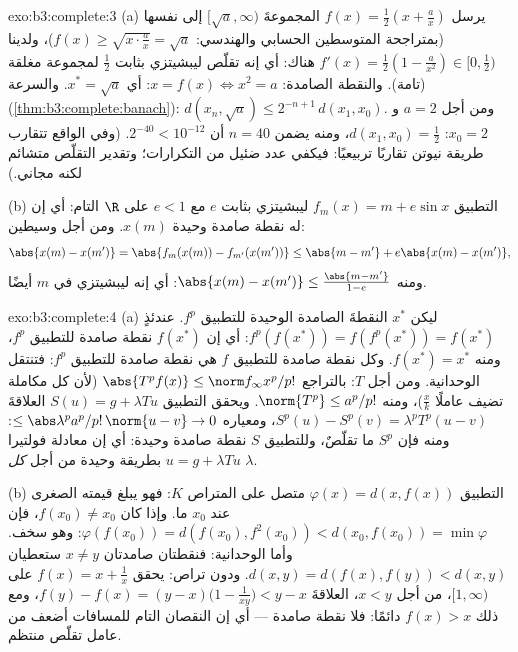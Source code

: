 \begin{solution}{exo:b3:complete:3}
(a) يرسل $f(x) = \frac12(x + \frac ax)$ المجموعةَ $[\sqrt a, \infty)$ إلى نفسها (بمتراجحة المتوسطين
الحسابي والهندسي: $f(x) \geq \sqrt{x \cdot \frac ax} = \sqrt a$)، ولدينا $f'(x) = \frac12(1 - \frac a{x^2}) \in [0, \frac12)$ هناك: أي إنه تقلّص
ليبشيتزي بثابت $\frac12$ لمجموعة مغلقة (تامة). والنقطة الصامدة:
$x = f(x) \iff x^2 = a$: أي $x^* = \sqrt a$. والسرعة (\cref{thm:b3:complete:banach}): $d(x_n, \sqrt a) \leq
2^{-n+1}\,d(x_1, x_0)$. ومن
أجل $a = 2$ و $x_0 = 2$: $d(x_1, x_0) =
\frac12$، ومنه يضمن $n = 40$ أن $2^{-40} < 10^{-12}$.
(وفي الواقع تتقارب طريقة نيوتن تقاربًا تربيعيًا: فيكفي عدد
ضئيل من التكرارات؛ وتقدير التقلّص متشائم لكنه مجاني.)

(b) التطبيق $f_m(x) = m + e\sin x$ ليبشيتزي بثابت $e$ مع $e < 1$ على $\R$
التام: أي إن له نقطة صامدة وحيدة $x(m)$. ومن أجل وسيطين:
\[
\abs{x(m) - x(m')} = \abs{f_m(x(m)) - f_{m'}(x(m'))}
\leq \abs{m - m'} + e\abs{x(m) - x(m')},
\]
ومنه $\abs{x(m) - x(m')} \leq \frac{\abs{m - m'}}{1 - e}$: أي إنه ليبشيتزي في $m$ أيضًا.
\end{solution}

\begin{solution}{exo:b3:complete:4}
(a) ليكن $x^*$ النقطةَ الصامدة الوحيدة للتطبيق $f^p$. عندئذٍ
$f^p(f(x^*)) = f(f^p(x^*)) = f(x^*)$: أي إن $f(x^*)$ نقطة صامدة للتطبيق $f^p$، ومنه
$f(x^*) = x^*$. وكل نقطة صامدة للتطبيق $f$ هي نقطة صامدة
للتطبيق $f^p$: فتنتقل الوحدانية. ومن أجل $T$: بالتراجع $\abs{T^pf(x)}
\leq \norm f_\infty x^p/p!$
(لأن كل مكاملة تضيف عاملًا $\frac xk$)، ومنه $\norm{T^p} \leq a^p/p!$. ويحقق
التطبيق $S(u) = g +
\lambda Tu$ العلاقةَ $S^p(u) - S^p(v) = \lambda^pT^p(u - v)$، ومعياره $\leq \abs\lambda^pa^p/p!\,\norm{u - v} \to 0$: ومنه فإن $S^p$
ما تقلّصٌ، وللتطبيق $S$ نقطة صامدة وحيدة: أي إن معادلة فولتيرا $u = g + \lambda Tu$
 بطريقة وحيدة من أجل \emph{كل} $\lambda$.

(b) التطبيق $\varphi(x) = d(x, f(x))$ متصل على المتراص $K$: فهو يبلغ قيمته الصغرى
عند $x_0$ ما. وإذا كان $f(x_0) \neq x_0$، فإن $\varphi(f(x_0)) = d(f(x_0), f^2(x_0)) < d(x_0, f(x_0)) =
\min\varphi$: وهو سخف. وأما
الوحدانية: فنقطتان صامدتان $x \ne y$ ستعطيان $d(x,y) = d(f(x), f(y)) < d(x,y)$. ودون
تراص: يحقق $f(x) = x + \frac1x$ على $[1, \infty)$، من أجل $x < y$، العلاقةَ
$f(y) - f(x) = (y - x)\bigl(1 - \frac1{xy}\bigr) <
y - x$، ومع ذلك $f(x) > x$ دائمًا: فلا نقطة صامدة --- أي إن
النقصان التام للمسافات أضعف من عامل تقلّص منتظم.
\end{solution}

